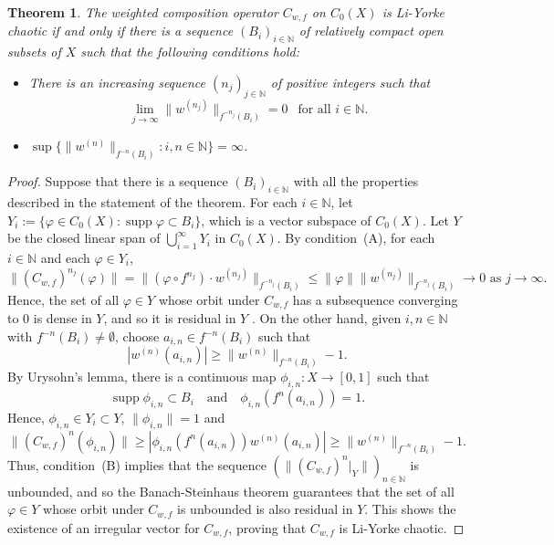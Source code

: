 \documentclass[12pt]{amsart}
\theoremstyle{theorem}
\newtheorem{theorem}{Theorem}%
\theoremstyle{definition}
\theoremstyle{remark} \theoremstyle{question} \theoremstyle{example}
\newcommand{\N}{\mathbb{N}}
\newcommand{\supp}{\operatorname{supp}}
\begin{document}
\begin{theorem}\label{MainLYCX}
The weighted composition operator $C_{w,f}$ on $C_0(X)$ is Li-Yorke chaotic if and only if there is a sequence $(B_i)_{i \in \N}$ of relatively compact open subsets of $X$ such that the following conditions hold:
\begin{itemize}
\item [\rm (A)] There is an increasing sequence $(n_j)_{j \in \N}$ of positive integers such that
\[
\lim_{j \to \infty} \|w^{(n_j)}\|_{f^{-n_j}(B_i)} = 0 \ \ \text{ for all } i \in \N.
\]
\item [\rm (B)] $\displaystyle \sup\big\{\|w^{(n)}\|_{f^{-n}(B_i)} : i,n \in \N\big\} = \infty$.
\end{itemize}
\end{theorem}

\begin{proof}
Suppose that there is a sequence $(B_i)_{i \in \N}$ with all the properties described in the statement of the theorem.
For each $i \in \N$, let $Y_i\!:= \{\varphi \in C_0(X) : \supp \varphi \subset B_i\}$, which is a vector subspace of $C_0(X)$. 
Let $Y$ be the closed linear span of $\bigcup_{i=1}^\infty Y_i$ in $C_0(X)$. 
By condition~(A), for each $i \in \N$ and each $\varphi \in Y_i$,
\[
\|(C_{w,f})^{n_j}(\varphi)\| = \|(\varphi \circ f^{n_j}) \cdot w^{(n_j)}\|_{f^{-n_j}(B_i)} \leq \|\varphi\| \|w^{(n_j)}\|_{f^{-n_j}(B_i)}
 \to 0 \text{ as } j \to \infty.
\]
Hence, the set of all $\varphi \in Y$ whose orbit under $C_{w,f}$ has a subsequence converging to $0$ is dense in $Y$, 
and so it is residual in $Y$ \cite[Proposition~3]{BerBonMulPer15}. 
On the other hand, given $i,n \in \N$ with $f^{-n}(B_i) \neq \emptyset$, choose $a_{i,n} \in f^{-n}(B_i)$ such that
\[
|w^{(n)}(a_{i,n})| \geq \|w^{(n)}\|_{f^{-n}(B_i)} - 1.
\]
By Urysohn's lemma, there is a continuous map $\phi_{i,n} : X \to [0,1]$ such that
\[
\supp \phi_{i,n} \subset B_i \ \ \ \text{ and } \ \ \ \phi_{i,n}(f^n(a_{i,n})) = 1.
\]
Hence, $\phi_{i,n} \in Y_i \subset Y$, $\|\phi_{i,n}\| = 1$ and
\[
\|(C_{w,f})^n(\phi_{i,n})\| \geq |\phi_{i,n}(f^n(a_{i,n})) w^{(n)}(a_{i,n})| \geq \|w^{(n)}\|_{f^{-n}(B_i)} - 1.
\]
Thus, condition~(B) implies that the sequence $(\|(C_{w,f})^n|_Y\|)_{n \in \N}$ is unbounded, and so the Banach-Steinhaus theorem \cite[Theorem~2.5]{WRud91} guarantees that the set of all $\varphi \in Y$ whose orbit under $C_{w,f}$ is unbounded is also residual in $Y$. 
This shows the existence of an irregular vector for $C_{w,f}$, proving that $C_{w,f}$ is Li-Yorke chaotic.


\end{proof}
\end{document}
